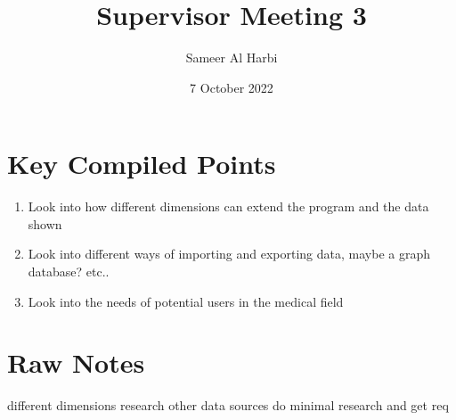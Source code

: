 \documentclass{article}
\title{ Supervisor Meeting \textbf{3} }
\author{Sameer Al Harbi}
\date{7 October 2022}
\begin{document}
\maketitle

\section{Key Compiled Points}
\begin{enumerate}
    \item Look into how different dimensions can extend the program and the data shown
    \item Look into different ways of importing and exporting data, maybe a graph database? etc..
    \item Look into the needs of potential users in the medical field
\end{enumerate}

\section{Raw Notes}

different dimensions research
other data sources 
do minimal research and get req
\end{document}
